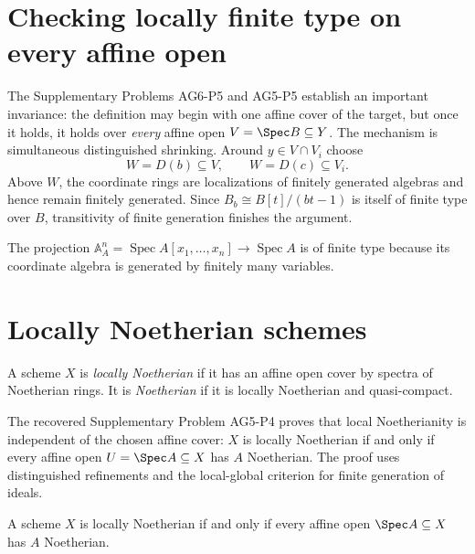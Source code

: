 

\section{Checking locally finite type on every affine open}
The Supplementary Problems AG6-P5 and AG5-P5 establish an important invariance: the definition may begin with one
affine cover of the target, but once it holds, it holds over \emph{every} affine open $V=\Spec B\subseteq Y$.
The mechanism is simultaneous distinguished shrinking.  Around $y\in V\cap V_i$ choose
\[
W=D(b)\subseteq V,\qquad W=D(c)\subseteq V_i.
\]
Above $W$, the coordinate rings are localizations of finitely generated algebras and hence remain finitely
generated.  Since $B_b\cong B[t]/(bt-1)$ is itself of finite type over $B$, transitivity of finite generation
finishes the argument.



\begin{example}\label{ex:vi26-expand-01}
The projection $\mathbb A^n_A=\operatorname{Spec}A[x_1,\ldots,x_n]\to\operatorname{Spec}A$ is of finite type because its coordinate algebra is generated by finitely many variables.
\end{example}
\section{Locally Noetherian schemes}
\begin{definition}\label{def:vi26-noetherian-scheme}
A scheme $X$ is \emph{locally Noetherian} if it has an affine open cover by spectra of Noetherian rings.  It is
\emph{Noetherian} if it is locally Noetherian and quasi-compact.
\end{definition}

The recovered Supplementary Problem AG5-P4 proves that local Noetherianity is independent of the chosen affine cover:
$X$ is locally Noetherian if and only if every affine open $U=\Spec A\subseteq X$ has $A$ Noetherian.  The
proof uses distinguished refinements and the local-global criterion for finite generation of ideals.

\begin{theorem}\label{thm:vi26-affine-noetherian}
A scheme $X$ is locally Noetherian if and only if every affine open $\Spec A\subseteq X$ has $A$ Noetherian.
\end{theorem}

